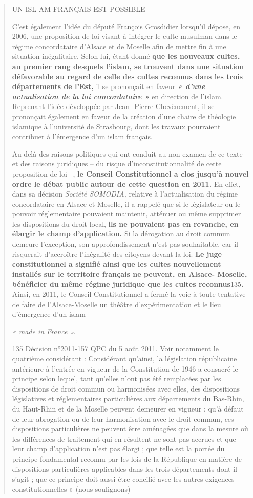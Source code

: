 \begin{quote}
UN ISL AM FRANÇAIS EST POSSIBLE

C'est également l'idée du député François Grosdidier lorsqu'il dépose,
en 2006, une proposition de loi visant à intégrer le culte musulman dans
le régime concordataire d'Alsace et de Moselle afin de mettre fin à une
situation inégalitaire. Selon lui, étant donné \textbf{que les nouveaux
cultes, au premier rang desquels l'islam, se trouvent dans une situation
défavorable au regard de celle des cultes reconnus dans les trois
départements de l'Est,} il se prononçait en faveur \emph{\textbf{« d'une
actualisation de la loi concordataire »}} en direction de l'islam.
Reprenant l'idée développée par Jean- Pierre Chevènement, il se
prononçait également en faveur de la création d'une chaire de théologie
islamique à l'université de Strasbourg, dont les travaux pourraient
contribuer à l'émergence d'un islam français.

Au-delà des raisons politiques qui ont conduit au non-examen de ce texte
et des raisons juridiques -- du risque d'inconstitutionnalité de cette
proposition de loi --, \textbf{le Conseil Constitutionnel a clos jusqu'à
nouvel ordre le débat public autour de cette question en 2011.} En
effet, dans sa décision \emph{Société SOMODIA,} relative à
l'actualisation du régime concordataire en Alsace et Moselle, il a
rappelé que si le législateur ou le pouvoir réglementaire pouvaient
maintenir, atténuer ou même supprimer les dispositions du droit local,
\textbf{ils ne pouvaient pas en revanche, en élargir le champ
d'application.} Si la dérogation au droit commun demeure l'exception,
son approfondissement n'est pas souhaitable, car il risquerait
d'accroître l'inégalité des citoyens devant la loi. \textbf{Le juge
constitutionnel a signifié ainsi que les cultes nouvellement installés
sur le territoire français ne peuvent, en Alsace- Moselle, bénéficier du
même régime juridique que les cultes reconnus}135\textbf{.} Ainsi, en
2011, le Conseil Constitutionnel a fermé la voie à toute tentative de
faire de l'Alsace-Moselle un théâtre d'expérimentation et le lieu
d'émergence d'un islam

\emph{« made in France ».}

135 Décision n°2011-157 QPC du 5 août 2011. Voir notamment le quatrième
considérant : Considérant qu'ainsi, la législation républicaine
antérieure à l'entrée en vigueur de la Constitution de 1946 a consacré
le principe selon lequel, tant qu'elles n'ont pas été remplacées par les
dispositions de droit commun ou harmonisées avec elles, des dispositions
législatives et réglementaires particulières aux départements du
Bas-Rhin, du Haut-Rhin et de la Moselle peuvent demeurer en vigueur ;
qu'à défaut de leur abrogation ou de leur harmonisation avec le droit
commun, ces dispositions particulières ne peuvent être aménagées que
dans la mesure où les différences de traitement qui en résultent ne sont
pas accrues et que leur champ d'application n'est pas élargi ; que telle
est la portée du principe fondamental reconnu par les lois de la
République en matière de dispositions particulières applicables dans les
trois départements dont il s'agit ; que ce principe doit aussi être
concilié avec les autres exigences constitutionnelles » (nous
soulignons)


\end{quote}
